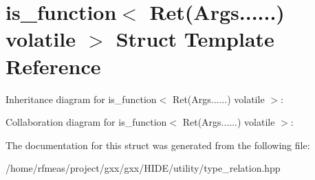 \hypertarget{structis__function_3_01Ret_07Args_8_8_8_8_8_8_08_01volatile_01_4}{}\section{is\+\_\+function$<$ Ret(Args......) volatile $>$ Struct Template Reference}
\label{structis__function_3_01Ret_07Args_8_8_8_8_8_8_08_01volatile_01_4}


Inheritance diagram for is\+\_\+function$<$ Ret(Args......) volatile $>$\+:


Collaboration diagram for is\+\_\+function$<$ Ret(Args......) volatile $>$\+:


The documentation for this struct was generated from the following file\+:\begin{DoxyCompactItemize}
\item 
/home/rfmeas/project/gxx/gxx/\+H\+I\+D\+E/utility/type\+\_\+relation.\+hpp\end{DoxyCompactItemize}
